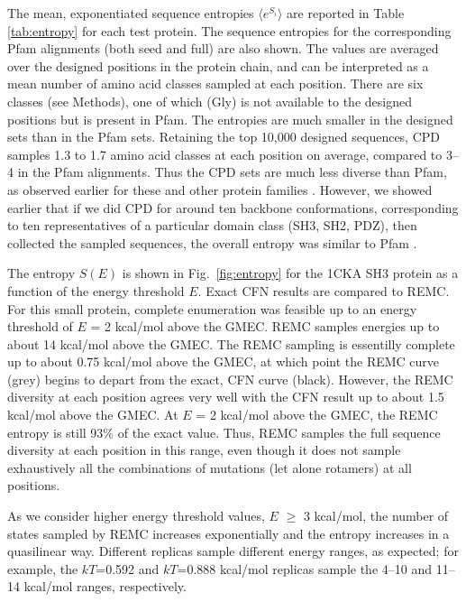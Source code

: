 \documentclass[a4paper,12pt]{article}
\begin{document}
The mean, exponentiated sequence entropies $\langle e^{S_i}\rangle$ are reported in Table \ref{tab:entropy} for each
test protein. The sequence entropies for the corresponding Pfam alignments (both seed and full) are also shown. The
values are averaged over the designed positions in the protein chain, and can be interpreted as a mean number of amino
acid classes sampled at each position. There are six classes (see Methods), one of which (Gly) is not available to the
designed positions but is present in Pfam. The entropies are much smaller in the designed sets than in the Pfam sets.
Retaining the top 10,000 designed sequences, CPD samples 1.3 to 1.7 amino acid classes at each position on average,
compared to 3--4 in the Pfam alignments. Thus the CPD sets are much less diverse than Pfam, as observed earlier for
these and other protein families \cite{Schmidt09,Schmidt10}. However, we showed earlier that if we did CPD for around
ten backbone conformations, corresponding to ten representatives of a particular domain class (SH3, SH2, PDZ), then
collected the sampled sequences, the overall entropy was similar to Pfam \cite{Schmidt09,Schmidt10}. 

The entropy $S(E)$ is shown in Fig.\ \ref{fig:entropy} for the 1CKA SH3 protein as a function of the energy threshold $E$.
Exact CFN results are compared to REMC. For this small protein, complete enumeration was feasible up to an energy threshold
of $E$ = 2 kcal/mol above the GMEC. REMC samples energies up to about 14 kcal/mol above the GMEC. The REMC sampling is
essentilly complete up to about 0.75 kcal/mol above the GMEC, at which point the REMC curve (grey) begins to depart from
the exact, CFN curve (black). However, the REMC diversity at each position agrees very well with the CFN result up to
about 1.5 kcal/mol above the GMEC. At $E$ = 2 kcal/mol above the GMEC, the REMC entropy is still 93\% of the exact value.
Thus, REMC samples the full sequence diversity at each position in this range, even though it does not sample exhaustively
all the combinations of mutations (let alone rotamers) at all positions.

As we consider higher energy threshold values, $E$ $\ge$ 3 kcal/mol, the number of states sampled by REMC increases
exponentially and the entropy increases in a quasilinear way. Different replicas sample different energy ranges, as
expected; for example, the $kT$=0.592 and $kT$=0.888 kcal/mol replicas sample the 4--10 and 11--14 kcal/mol ranges, 
respectively. 
\end{document}
